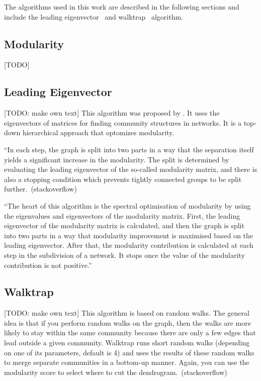 The algorithms used in this work are described in the following sections and include the leading eigenvector~\cite{newman2006finding} and walktrap~\cite{pons2005computing} algorithm.

\subsection{Modularity}
[TODO]

\subsection{Leading Eigenvector}
[TODO: make own text]
This algorithm was proposed by \textcite{newman2006finding}. It uses the eigenvectors of matrices for finding community structures in networks. It is a top-down hierarchical approach that optomizes modularity.

``In each step, the graph is split into two parts in a way that the separation itself yields a significant increase in the modularity. The split is determined by evaluating the leading eigenvector of the so-called modularity matrix, and there is also a stopping condition which prevents tightly connected groups to be split further.~(stackoverflow)

``The heart of this algorithm is the spectral optimisation of modularity by using the eigenvalues and eigenvectors of the modularity matrix. First, the leading eigenvector of the modularity matrix is calculated, and then the graph is split into two parts in a way that modularity improvement is maximised based on the leading eigenvector. After that, the modularity contribution is calculated at each step in the subdivision of a network. It stops once the value of the modularity contribution is not positive.''~\cite{yang2016comparative}

\subsection{Walktrap}
[TODO: make own text]
This algorithm is based on random walks. The general idea is that if you perform random walks on the graph, then the walks are more likely to stay within the same community because there are only a few edges that lead outside a given community. Walktrap runs short random walks (depending on one of its parameters, default is 4) and uses the results of these random walks to merge separate communities in a bottom-up manner. Again, you can use the modularity score to select where to cut the dendrogram.~(stackoverflow)

